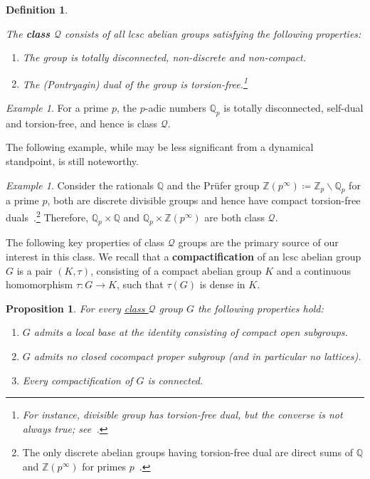 \documentclass{amsart}
\numberwithin{equation}{subsection}
\newtheorem{prop}[thm]{Proposition}
\newtheorem{defn}[thm]{Definition}
\theoremstyle{remark}
\newtheorem{exm}[thm]{Example}
\begin{document}
\begin{defn}
\hypertarget{classQ}{}
The {\bf class \(\mathcal{Q}\)} consists of all lcsc abelian groups satisfying the following properties:
\begin{enumerate}
    \item The group is totally disconnected, non-discrete and non-compact.
    \item The (Pontryagin) dual of the group is torsion-free.\footnote{For instance, divisible group has torsion-free dual, but the converse is not always true; see~\cite[Theorem (24.23)]{HewittRoss}.}
\end{enumerate}
\end{defn}

\begin{exm}
For a prime \(p\), the \(p\)-adic numbers \(\mathbb{Q}_{p}\) is totally disconnected, self-dual and torsion-free, and hence is class \(\mathcal{Q}\).
\end{exm}

The following example, while may be less significant from a dynamical standpoint, is still noteworthy.

\begin{exm}
Consider the rationals \(\mathbb{Q}\) and the Pr\"{u}fer group \(\mathbb{Z}\left(p^{\infty}\right)\coloneqq\mathbb{Z}_{p}\backslash\mathbb{Q}_{p}\) for a prime \(p\), both are discrete divisible groups and hence have compact torsion-free duals~\cite[Theorem (24.25)]{HewittRoss}.\footnote{The only discrete abelian groups having torsion-free dual are direct sums of \(\mathbb{Q}\) and \(\mathbb{Z}\left(p^{\infty}\right)\) for primes \(p\)~\cite[Theorem A1.42, Corollary 8.5]{hofmann2006structure}.} Therefore, \(\mathbb{Q}_{p}\times \mathbb{Q}\) and \(\mathbb{Q}_{p}\times\mathbb{Z}\left(p^{\infty}\right)\) are both class \(\mathcal{Q}\).
\end{exm}

The following key properties of class \(\mathcal{Q}\) groups are the primary source of our interest in this class. We recall that a {\bf compactification} of an lcsc abelian group \(G\) is a pair \(\left(K,\tau\right)\), consisting of a compact abelian group \(K\) and a continuous homomorphism \(\tau:G\to K\), such that \(\tau\left(G\right)\) is dense in \(K\).

\begin{prop}\label{prop:classqgrp}
For every \hyperlink{classQ}{class \(\mathcal{Q}\)} group \(G\) the following properties hold:
\begin{enumerate}
    \item \(G\) admits a local base at the identity consisting of compact open subgroups.
    \item \(G\) admits no closed cocompact proper subgroup (and in particular no lattices).
    \item Every compactification of \(G\) is connected.
\end{enumerate}
\end{prop}
\end{document}
